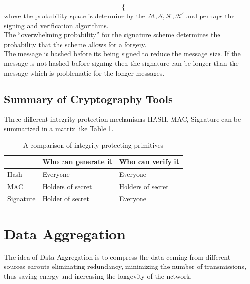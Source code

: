 \documentclass[%
  slidesonly,%
  semlayer%
  ]{seminar}                                  %
\begin{document}
\begin{slide}
\begin{equation}
\begin{cases}
      \end{cases}
      \label{eq:verification}
    \end{equation}
    where the probability space is determine by the $\mathcal {M, S, K, K^{'}}$ and perhaps the signing and verification algorithms.\\
    The ``overwhelming probability'' for the signature scheme determines the probability that the scheme allows for a forgery.\\
    The message is hashed before its being signed to reduce the message size. 
    If the message is not hashed before signing then the signature can be longer than the message which is problematic for the longer messages.
    \clearpage

  \subsection*{Summary of Cryptography Tools}
    Three different integrity-protection mechanisms HASH, MAC, Signature can be summarized in a matrix like Table \ref{table:summary}.\\
    \begin{table}[!htb] 
      \begin{center}
        \begin{tabular}{ |l || l| l| }
          \hline
           & Who can generate it & Who can verify it \\
          \hline
          \hline
          Hash & Everyone & Everyone \\ 
          \hline
          MAC & Holders of secret & Holders of secret \\
          \hline
          Signature & Holder of secret & Everyone \\
          \hline
        \end{tabular}
      \end{center}
      \caption{A comparison of integrity-protecting primitives}
      \label{table:summary}
    \end{table}
    \clearpage

\section*{Data Aggregation}

  The idea of Data Aggregation is to compress the data coming from different sources enroute eliminating redundancy, minimizing the number of transmissions, thus saving energy and increasing the longevity of the network.


\end{slide}
\end{document}
